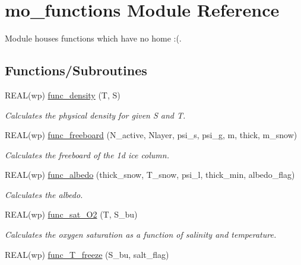 \hypertarget{namespacemo__functions}{
\section{mo\_\-functions Module Reference}
\label{namespacemo__functions}
}


Module houses functions which have no home :(.  


\subsection*{Functions/Subroutines}
\begin{DoxyCompactItemize}
\item 
REAL(wp) \hyperlink{namespacemo__functions_a1799a36a0ad153bc87957b7e87ad9b3c}{func\_\-density} (T, S)
\begin{DoxyCompactList}\small\item\em Calculates the physical density for given S and T. \item\end{DoxyCompactList}\item 
REAL(wp) \hyperlink{namespacemo__functions_a3f4e5c13d71b23efaa040a3d14e55f64}{func\_\-freeboard} (N\_\-active, Nlayer, psi\_\-s, psi\_\-g, m, thick, m\_\-snow)
\begin{DoxyCompactList}\small\item\em Calculates the freeboard of the 1d ice column. \item\end{DoxyCompactList}\item 
REAL(wp) \hyperlink{namespacemo__functions_ac51bdce087ab161f25d6ad11a28e655c}{func\_\-albedo} (thick\_\-snow, T\_\-snow, psi\_\-l, thick\_\-min, albedo\_\-flag)
\begin{DoxyCompactList}\small\item\em Calculates the albedo. \item\end{DoxyCompactList}\item 
REAL(wp) \hyperlink{namespacemo__functions_a2983289475e56c950511d8b6e37b1064}{func\_\-sat\_\-O2} (T, S\_\-bu)
\begin{DoxyCompactList}\small\item\em Calculates the oxygen saturation as a function of salinity and temperature. \item\end{DoxyCompactList}\item 
REAL(wp) \hyperlink{namespacemo__functions_a9413c611dfaf39e6cf8441a766b5df8b}{func\_\-T\_\-freeze} (S\_\-bu, salt\_\-flag)

\end{DoxyCompactItemize}
